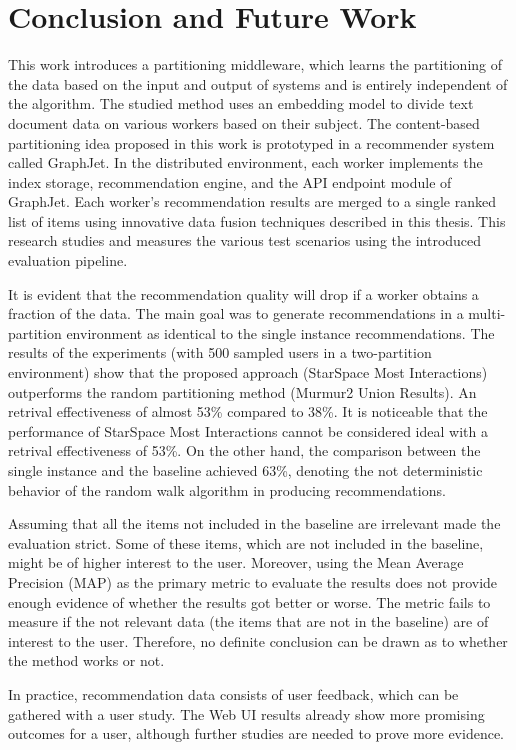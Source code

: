 \chapter{Conclusion and Future Work}

This work introduces a partitioning middleware, which learns the partitioning of the data based on the input and output of systems and is entirely independent of the algorithm. The studied method uses an embedding model to divide text document data on various workers based on their subject. The content-based partitioning idea proposed in this work is prototyped in a recommender system called GraphJet. In the distributed environment, each worker implements the index storage, recommendation engine, and the API endpoint module of GraphJet. Each worker's recommendation results are merged to a single ranked list of items using innovative data fusion techniques described in this thesis. This research studies and measures the various test scenarios using the introduced evaluation pipeline.


It is evident that the recommendation quality will drop if a worker obtains a fraction of the data. The main goal was to generate recommendations in a multi-partition environment as identical to the single instance recommendations. The results of the experiments (with 500 sampled users in a two-partition environment) show that the proposed approach (StarSpace Most Interactions) outperforms the random partitioning method (Murmur2 Union Results). An retrival effectiveness of almost 53\% compared to 38\%. It is noticeable that the performance of StarSpace Most Interactions cannot be considered ideal with a retrival effectiveness of 53\%. On the other hand, the comparison between the single instance and the baseline achieved 63\%, denoting the not deterministic behavior of the random walk algorithm in producing recommendations.


Assuming that all the items not included in the baseline are irrelevant made the evaluation strict. Some of these items, which are not included in the baseline, might be of higher interest to the user. Moreover, using the Mean Average Precision (MAP) as the primary metric to evaluate the results does not provide enough evidence of whether the results got better or worse. The metric fails to measure if the not relevant data (the items that are not in the baseline) are of interest to the user. Therefore, no definite conclusion can be drawn as to whether the method works or not. 


In practice, recommendation data consists of user feedback, which can be gathered with a user study. The Web UI results already show more promising outcomes for a user, although further studies are needed to prove more evidence. 


